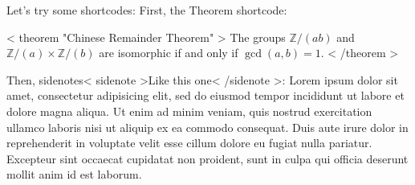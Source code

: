 \documentclass[12pt]{article}
\theoremstyle{TheoremStyle}
\begin{document}
	

\begin{markdown}
Let's try some shortcodes: First, the Theorem shortcode:

{{< theorem "Chinese Remainder Theorem" >}} The groups $\mathbb{Z}/(ab)$ and $\mathbb{Z}/(a)\times \mathbb{Z}/(b)$ are isomorphic if and only if $\gcd(a,b)=1$.
{{< /theorem >}}

Then, sidenotes{{< sidenote >}}Like this one{{< /sidenote >}}: Lorem ipsum dolor sit amet, consectetur adipisicing elit, sed do eiusmod tempor incididunt ut labore et dolore magna aliqua. Ut enim ad minim veniam, quis nostrud exercitation ullamco laboris nisi ut aliquip ex ea commodo consequat. Duis aute irure dolor in reprehenderit in voluptate velit esse cillum dolore eu fugiat nulla pariatur. Excepteur sint occaecat cupidatat non proident, sunt in culpa qui officia deserunt mollit anim id est laborum. 

\end{markdown}
\end{document}

